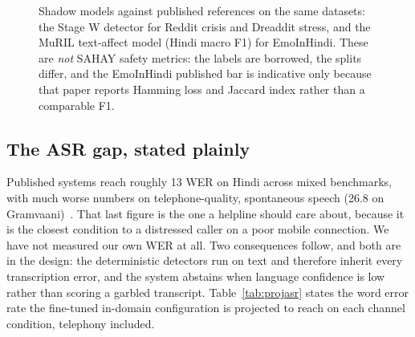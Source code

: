 \documentclass[11pt,a4paper]{article}
\begin{document}
\begin{figure}[!htbp]
\centering
{}
\caption{Shadow models against published references on the same datasets: the Stage W detector for
Reddit crisis and Dreaddit stress, and the MuRIL text-affect model (Hindi macro F1) for EmoInHindi.
These are \emph{not} SAHAY safety metrics: the labels are borrowed, the splits differ, and the
EmoInHindi published bar is indicative only because that paper reports Hamming loss and Jaccard index
rather than a comparable F1.}
\label{fig:benchbars}
\end{figure}

\subsection{The ASR gap, stated plainly}
Published systems reach roughly 13 WER on Hindi across mixed benchmarks, with much worse numbers on
telephone-quality, spontaneous speech (26.8 on Gramvaani)~\cite{vistaar}. That last figure is the one
a helpline should care about, because it is the closest condition to a distressed caller on a poor
mobile connection. We have not measured our own WER at all. Two consequences follow, and both are in
the design: the deterministic detectors run on text and therefore inherit every transcription error,
and the system abstains when language confidence is low rather than scoring a garbled transcript.
Table~\ref{tab:projasr} states the word error rate the fine-tuned in-domain configuration is
projected to reach on each channel condition, telephony included.
\end{document}
